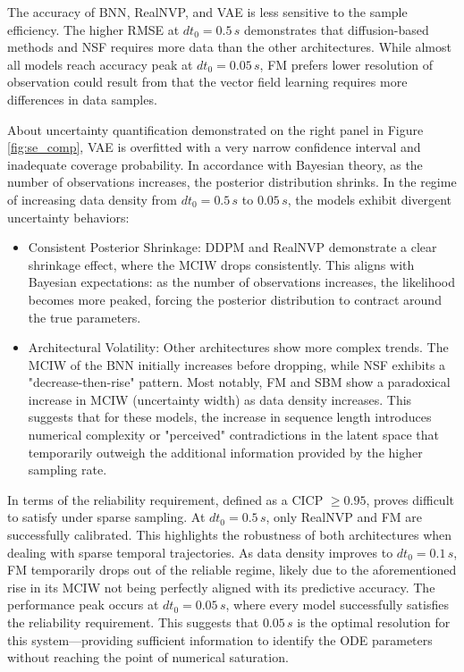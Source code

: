The accuracy of \ac{BNN}, \ac{RealNVP}, and \ac{VAE} is less sensitive to the sample efficiency. The higher RMSE at $dt_0=0.5\,s$ demonstrates that diffusion-based methods and \ac{NSF} requires more data than the other architectures. While almost all models reach accuracy peak at $dt_0=0.05\,s$, \ac{FM} prefers lower resolution of observation could result from that the vector field learning requires more differences in data samples. 

About uncertainty quantification demonstrated on the right panel in Figure \ref{fig:se_comp}, \ac{VAE} is overfitted with a very narrow confidence interval and inadequate coverage probability. In accordance with Bayesian theory, as the number of observations increases, the posterior distribution shrinks. In the regime of increasing data density from $dt_0=0.5\,s$ to $0.05\,s$, the models exhibit divergent uncertainty behaviors:
\begin{itemize}
    \item Consistent Posterior Shrinkage: \ac{DDPM} and \ac{RealNVP} demonstrate a clear shrinkage effect, where the MCIW drops consistently. This aligns with Bayesian expectations: as the number of observations increases, the likelihood becomes more peaked, forcing the posterior distribution to contract around the true parameters.
    \item Architectural Volatility: Other architectures show more complex trends. The MCIW of the \ac{BNN} initially increases before dropping, while \ac{NSF} exhibits a "decrease-then-rise" pattern. Most notably, \ac{FM} and \ac{SBM} show a paradoxical increase in MCIW (uncertainty width) as data density increases. This suggests that for these models, the increase in sequence length introduces numerical complexity or "perceived" contradictions in the latent space that temporarily outweigh the additional information provided by the higher sampling rate.
\end{itemize}
   
    
In terms of the reliability requirement, defined as a \ac{CICP} $\ge 0.95$, proves difficult to satisfy under sparse sampling. At $dt_0=0.5\,s$, only \ac{RealNVP} and \ac{FM} are successfully calibrated. This highlights the robustness of both architectures when dealing with sparse temporal trajectories. As data density improves to $dt_0=0.1\,s$, \ac{FM} temporarily drops out of the reliable regime, likely due to the aforementioned rise in its \ac{MCIW} not being perfectly aligned with its predictive accuracy. The performance peak occurs at $dt_0=0.05\,s$, where every model successfully satisfies the reliability requirement. This suggests that $0.05\,s$ is the optimal resolution for this system—providing sufficient information to identify the ODE parameters without reaching the point of numerical saturation. 

